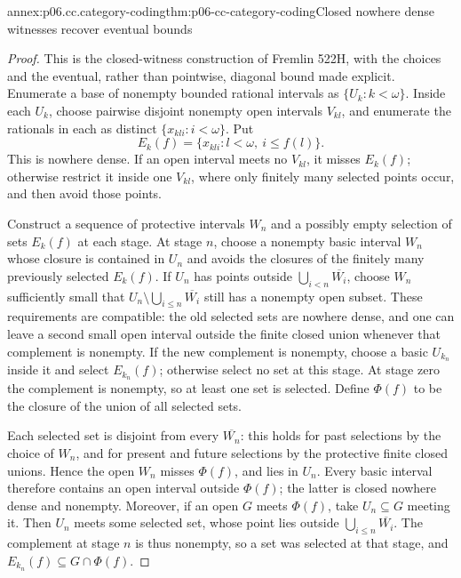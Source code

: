 \begin{annexitem}{annex:p06.cc.category-coding}{thm:p06-cc-category-coding}{Closed nowhere dense witnesses recover eventual bounds}
\begin{proof}
This is the closed-witness construction of Fremlin 522H, with the choices
and the eventual, rather than pointwise, diagonal bound made explicit.
Enumerate a base of nonempty bounded rational intervals as
\(\{U_k:k<\omega\}\). Inside each \(U_k\), choose pairwise disjoint
nonempty open intervals \(V_{kl}\), and enumerate the rationals in each
as distinct \(\{x_{kli}:i<\omega\}\). Put
\[
 E_k(f)=\{x_{kli}:l<\omega,\ i\leq f(l)\}.
\]
This is nowhere dense. If an open interval meets no \(V_{kl}\), it
misses \(E_k(f)\); otherwise restrict it inside one \(V_{kl}\), where
only finitely many selected points occur, and then avoid those points.

Construct a sequence of protective intervals \(W_n\) and a possibly
empty selection of sets \(E_k(f)\) at each stage. At stage \(n\),
choose a nonempty basic interval \(W_n\) whose closure is contained
in \(U_n\) and avoids the closures of the finitely many previously
selected \(E_k(f)\). If \(U_n\) has points outside
\(\bigcup_{i<n}\overline{W_i}\), choose \(W_n\) sufficiently small
that \(U_n\setminus\bigcup_{i\leq n}\overline{W_i}\) still has a
nonempty open subset. These requirements are compatible: the old
selected sets are nowhere dense, and one can leave a second small open
interval outside the finite closed union whenever that complement is
nonempty. If the new complement is nonempty, choose a basic
\(U_{k_n}\) inside it and select \(E_{k_n}(f)\); otherwise select no
set at this stage. At stage zero the complement is nonempty, so at least
one set is selected. Define \(\Phi(f)\) to be the closure of the union
of all selected sets.

Each selected set is disjoint from every \(\overline{W_n}\): this
holds for past selections by the choice of \(W_n\), and for present
and future selections by the protective finite closed unions. Hence
the open \(W_n\) misses \(\Phi(f)\), and lies in \(U_n\).
Every basic interval therefore contains an open interval outside
\(\Phi(f)\); the latter is closed nowhere dense and nonempty.
Moreover, if an open \(G\) meets \(\Phi(f)\), take
\(U_n\subseteq G\) meeting it. Then \(U_n\) meets some selected
set, whose point lies outside \(\bigcup_{i\leq n}\overline{W_i}\).
The complement at stage \(n\) is thus nonempty, so a set was selected
at that stage, and \(E_{k_n}(f)\subseteq G\cap\Phi(f)\).


\end{proof}
\end{annexitem}
